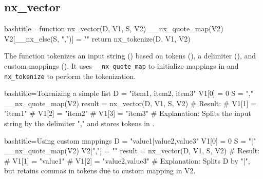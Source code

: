 \newpage
\subsection{nx_vector}
\label{nx_vector}
\begin{NexCodeBox}{bash}{title={}}
function nx_vector(D, V1, S, V2) {
	__nx_quote_map(V2)
	V2[__nx_else(S, ",")] = ""
	return nx_tokenize(D, V1, V2)
}
\end{NexCodeBox}

\begin{NexMainBox}
	\begin{NexMainBox}
		The  function tokenizes an input string () based on tokens (), a delimiter (), and custom mappings (). It uses \texttt{__nx_quote_map} to initialize mappings in  and \texttt{nx_tokenize} to perform the tokenization.
	\end{NexMainBox}
	\begin{NexMainBox}
		\begin{NexListDark}
		\end{NexListDark}
	\end{NexMainBox}
\end{NexMainBox}

\begin{NexCodeBox}{bash}{title={Tokenizing a simple list}}
	D = "item1, item2, item3"
	V1[0] = 0
	S = ","
	__nx_quote_map(V2)
	result = nx_vector(D, V1, S, V2)
	# Result:
	# V1[1] = "item1"
	# V1[2] = "item2"
	# V1[3] = "item3"
	# Explanation: Splits the input string by the delimiter "," and stores tokens in .
\end{NexCodeBox}

\begin{NexCodeBox}{bash}{title={Using custom mappings}}
	D = "value1|value2,value3"
	V1[0] = 0
	S = "|"
	__nx_quote_map(V2)
	V2[","] = ""
	result = nx_vector(D, V1, S, V2)
	# Result:
	# V1[1] = "value1"
	# V1[2] = "value2,value3"
	# Explanation: Splits D by "|", but retains commas in tokens due to custom mapping in V2.
\end{NexCodeBox}

